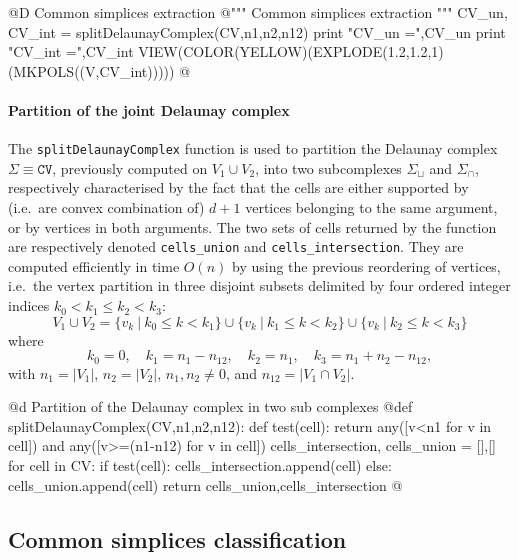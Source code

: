 \documentclass[11pt,oneside]{article}	%
\begin{document}
@D Common simplices extraction
@{""" Common simplices extraction """
CV_un, CV_int = splitDelaunayComplex(CV,n1,n2,n12)
print "\n CV_un =",CV_un
print "\n CV_int =",CV_int
VIEW(COLOR(YELLOW)(EXPLODE(1.2,1.2,1)(MKPOLS((V,CV_int)))))
@}


\paragraph{Partition of the joint Delaunay complex} 

The \texttt{splitDelaunayComplex} function is used to partition the Delaunay complex $\Sigma\equiv\texttt{CV}$, previously computed on $V_1 \cup V_2$, into two subcomplexes $\Sigma_\sqcup$ and $\Sigma_\cap$, respectively characterised by the fact that the cells  are either supported by (i.e.~are convex combination of)  $d+1$ vertices belonging to the same argument, or by vertices in both arguments.
The two sets of cells returned by the function are respectively denoted \texttt{cells\_union} and \texttt{cells\_intersection}. They are computed efficiently in time $O(n)$ by using the previous reordering of vertices, i.e.~the vertex partition in three disjoint subsets delimited by four ordered integer indices $k_0 < k_1 \leq k_2 < k_3$:
\[
V_1 \cup V_2 = 
\{v_k\ |\ k_0\leq k< k_1\} \cup
\{v_k\ |\ k_1\leq k< k_2\} \cup
\{v_k\ |\ k_2\leq k< k_3\}
\]
where
\[
k_0 =0, \quad k_1 =n_1-n_{12}, \quad k_2 =n_1, \quad  k_3=n_1+n_2-n_{12},
\]
with $n_1=|V_1|$, $n_2=|V_2|$, $n_1, n_2\not=0$, and $n_{12}=|V_1\cap V_2|$.

@d Partition of the Delaunay complex in two sub complexes
@{def splitDelaunayComplex(CV,n1,n2,n12):
	def test(cell):
		return any([v<n1 for v in cell]) and any([v>=(n1-n12) for v in cell])
	cells_intersection, cells_union = [],[]
	for cell in CV: 
		if test(cell): cells_intersection.append(cell)
		else: cells_union.append(cell)
	return cells_union,cells_intersection
@}




\subsection{Common simplices classification}
\end{document}
